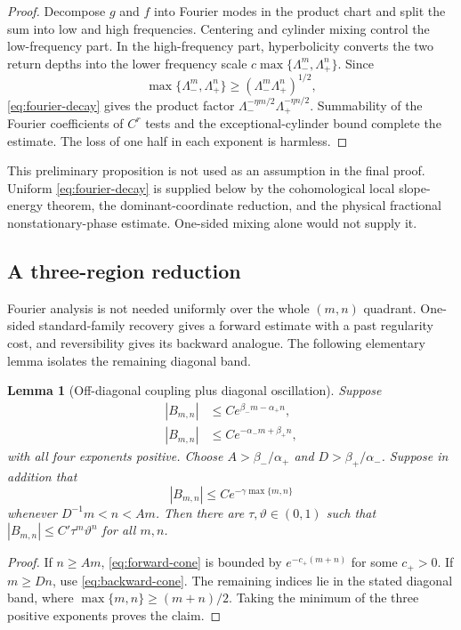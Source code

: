 \documentclass[11pt]{article}
\newtheorem{lemma}[theorem]{Lemma}
\begin{document}
\begin{proof}
Decompose $g$ and $f$ into Fourier modes in the product chart and split the
sum into low and high frequencies.  Centering and cylinder mixing control the
low-frequency part.  In the high-frequency part, hyperbolicity converts the
two return depths into the lower frequency scale
$c\max\{\Lambda_-^m,\Lambda_+^n\}$.  Since
\[
 \max\{\Lambda_-^m,\Lambda_+^n\}
 \ge (\Lambda_-^m\Lambda_+^n)^{1/2},
\]
\eqref{eq:fourier-decay} gives the product factor
$\Lambda_-^{-\eta m/2}\Lambda_+^{-\eta n/2}$.  Summability of the Fourier
coefficients of $C^r$ tests and the exceptional-cylinder bound complete the
estimate.  The loss of one half in each exponent is harmless.
\end{proof}

This preliminary proposition is not used as an assumption in the final proof.
Uniform \eqref{eq:fourier-decay} is supplied below by the cohomological
local slope-energy theorem, the dominant-coordinate reduction, and the
physical fractional nonstationary-phase estimate.  One-sided mixing alone
would not supply it.

\subsection{A three-region reduction}

Fourier analysis is not needed uniformly over the whole $(m,n)$ quadrant.
One-sided standard-family recovery gives a forward estimate with a past
regularity cost, and reversibility gives its backward analogue.  The following
elementary lemma isolates the remaining diagonal band.

\begin{lemma}[Off-diagonal coupling plus diagonal oscillation]
\label{lem:three-region}
Suppose
\begin{align}
 |B_{m,n}|&\le C e^{\beta_-m-\alpha_+n},\label{eq:forward-cone}\\
 |B_{m,n}|&\le C e^{-\alpha_-m+\beta_+n},\label{eq:backward-cone}
\end{align}
with all four exponents positive.  Choose
$A>\beta_-/\alpha_+$ and $D>\beta_+/\alpha_-$.  Suppose in addition that
\[
 |B_{m,n}|\le Ce^{-\gamma\max\{m,n\}}
\]
whenever $D^{-1}m<n<Am$.  Then there are
$\tau,\vartheta\in(0,1)$ such that
$|B_{m,n}|\le C'\tau^m\vartheta^n$ for all $m,n$.
\end{lemma}

\begin{proof}
If $n\ge Am$, \eqref{eq:forward-cone} is bounded by
$e^{-c_+(m+n)}$ for some $c_+>0$.  If $m\ge Dn$, use
\eqref{eq:backward-cone}.  The remaining indices lie in the stated diagonal
band, where $\max\{m,n\}\ge(m+n)/2$.  Taking the minimum of the three positive
exponents proves the claim.
\end{proof}
\end{document}
